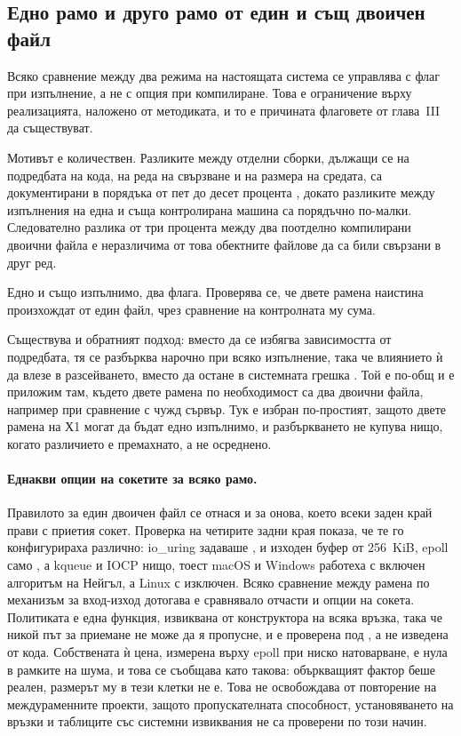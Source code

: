 \subsection{Едно рамо и друго рамо от един и същ двоичен файл}

Всяко сравнение между два режима на настоящата система се управлява с флаг при изпълнение,
а не с опция при компилиране. Това е ограничение върху реализацията, наложено от методиката,
и то е причината флаговете от глава~III да съществуват.

Мотивът е количествен. Разликите между отделни сборки, дължащи се на подредбата на кода, на
реда на свързване и на размера на средата, са документирани в порядъка от пет до десет
процента \cite{mytkowicz2009wrong}, докато разликите между изпълнения на една и съща
контролирана машина са порядъчно по-малки. Следователно разлика от три процента между два
поотделно компилирани двоични файла е неразличима от това обектните файлове да са били
свързани в друг ред.

Едно и също изпълнимо, два флага. Проверява се, че двете рамена наистина произхождат от
един файл, чрез сравнение на контролната му сума.

Съществува и обратният подход: вместо да се избягва зависимостта от подредбата, тя се
разбърква нарочно при всяко изпълнение, така че влиянието ѝ да влезе в разсейването, вместо
да остане в системната грешка \cite{curtsinger2013stabilizer}. Той е по-общ и е приложим
там, където двете рамена по необходимост са два двоични файла, например при сравнение с чужд
сървър. Тук е избран по-простият, защото двете рамена на Х1 могат да бъдат едно изпълнимо, и
разбъркването не купува нищо, когато различието е премахнато, а не осреднено.

\paragraph{Еднакви опции на сокетите за всяко рамо.} Правилото за един двоичен файл се отнася и
за онова, което всеки заден край прави с приетия сокет. Проверка на четирите задни края показа, че
те го конфигурираха различно: io\_uring задаваше ,  и
изходен буфер от 256~KiB, epoll само , а kqueue и IOCP нищо, тоест macOS и
Windows работеха с включен алгоритъм на Нейгъл, а Linux с изключен. Всяко сравнение между рамена
по механизъм за вход-изход дотогава е сравнявало отчасти и опции на сокета. Политиката е една
функция, извиквана от конструктора на всяка връзка, така че никой път за приемане не може да я
пропусне, и е проверена под , а не изведена от кода. Собствената ѝ цена, измерена
върху epoll при ниско натоварване, е нула в рамките на шума, и това се съобщава като такова:
объркващият фактор беше реален, размерът му в тези клетки не е. Това не освобождава от повторение
на междураменните проекти, защото пропускателната способност, установяването на връзки и
таблиците със системни извиквания не са проверени по този начин.

